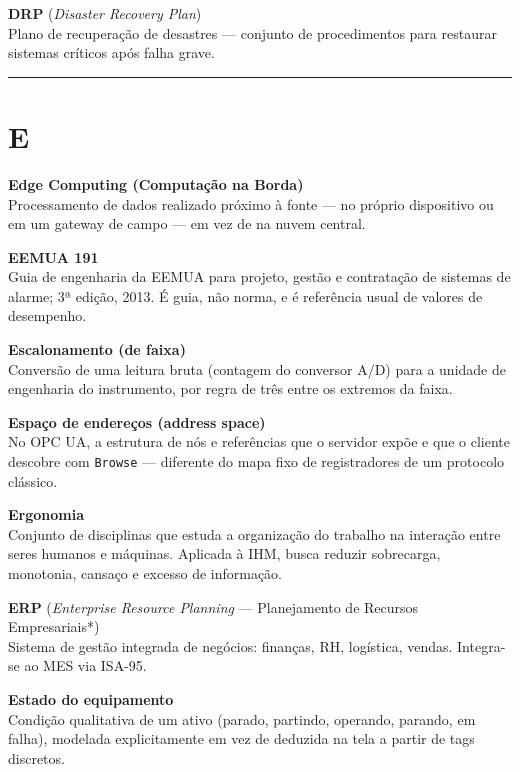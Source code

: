 \textbf{DRP} (\emph{Disaster Recovery Plan})\\
Plano de recuperação de desastres --- conjunto de procedimentos para restaurar sistemas críticos após falha grave.

\begin{center}\rule{0.5\linewidth}{0.5pt}\end{center}

\section{E}\label{e}

\textbf{Edge Computing (Computação na Borda)}\\
Processamento de dados realizado próximo à fonte --- no próprio dispositivo ou em um gateway de campo --- em vez de na nuvem central.

\textbf{EEMUA 191}\\
Guia de engenharia da EEMUA para projeto, gestão e contratação de sistemas de alarme; 3ª edição, 2013. É guia, não norma, e é referência usual de valores de desempenho.

\textbf{Escalonamento (de faixa)}\\
Conversão de uma leitura bruta (contagem do conversor A/D) para a unidade de engenharia do instrumento, por regra de três entre os extremos da faixa.

\textbf{Espaço de endereços (address space)}\\
No OPC UA, a estrutura de nós e referências que o servidor expõe e que o cliente descobre com \passthrough{\lstinline!Browse!} --- diferente do mapa fixo de registradores de um protocolo clássico.

\textbf{Ergonomia}\\
Conjunto de disciplinas que estuda a organização do trabalho na interação entre seres humanos e máquinas. Aplicada à IHM, busca reduzir sobrecarga, monotonia, cansaço e excesso de informação.

\textbf{ERP} (\emph{Enterprise Resource Planning} --- Planejamento de Recursos Empresariais*)\\
Sistema de gestão integrada de negócios: finanças, RH, logística, vendas. Integra-se ao MES via ISA-95.

\textbf{Estado do equipamento}\\
Condição qualitativa de um ativo (parado, partindo, operando, parando, em falha), modelada explicitamente em vez de deduzida na tela a partir de tags discretos.

